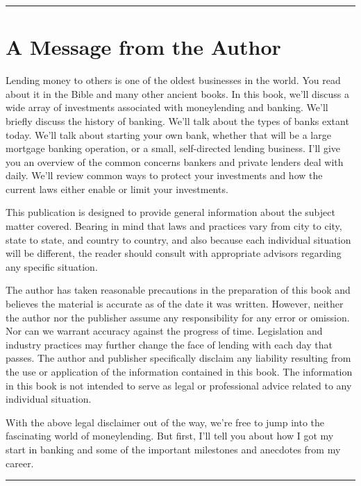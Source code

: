 \documentclass[
]{book}
\begin{document}
\begin{center}\rule{0.5\linewidth}{0.5pt}\end{center}

\hypertarget{authormessage}{%
\chapter*{A Message from the Author}\label{authormessage}}


Lending money to others is one of the oldest businesses in the world.
You read about it in the Bible and many other ancient books.
In this book, we'll discuss a wide array of investments associated with moneylending and banking.
We'll briefly discuss the history of banking.
We'll talk about the types of banks extant today.
We'll talk about starting your own bank,
whether that will be a large mortgage banking operation,
or a small, self-directed lending business.
I'll give you an overview of the common concerns bankers and private lenders deal with daily.
We'll review common ways to protect your investments and how the current laws either enable or limit your investments.

This publication is designed to provide general information about the subject matter covered.
Bearing in mind that laws and practices vary from city to city, state to state, and country to country,
and also because each individual situation will be different,
the reader should consult with appropriate advisors regarding any specific situation.

The author has taken reasonable precautions in the preparation of this book
and believes the material is accurate as of the date it was written.
However, neither the author nor the publisher assume any responsibility for any error or omission.
Nor can we warrant accuracy against the progress of time.
Legislation and industry practices may further change the face of lending with each day that passes.
The author and publisher specifically disclaim any liability resulting from the use or application of the information contained in this book.
The information in this book is not intended to serve as legal or professional advice related to any individual situation.

With the above legal disclaimer out of the way,
we're free to jump into the fascinating world of moneylending.
But first, I'll tell you about how I got my start in banking
and some of the important milestones and anecdotes from my career.

\begin{center}\rule{0.5\linewidth}{0.5pt}\end{center}
\end{document}
